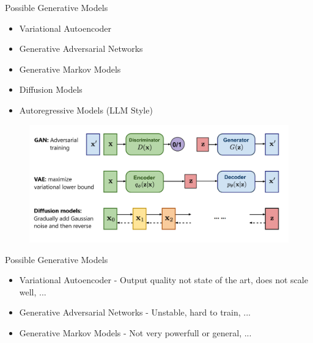 \documentclass[compress, aspectratio=169]{beamer}
\begin{document}
\begin{frame}{Possible Generative Models}
\begin{multicols}{2}
\begin{itemize}
    \item Variational Autoencoder
    \item Generative Adversarial Networks
    \item Generative Markov Models
    \item Diffusion Models
    \item Autoregressive Models (LLM Style)
\end{itemize}
\columnbreak

\begin{figure}
    \centering
    \includegraphics[width=1.0\linewidth]{figures/generativemodels.png}
\end{figure}
\end{multicols}

\end{frame}

\begin{frame}{Possible Generative Models}
\begin{itemize}
    \item Variational Autoencoder - Output quality not state of the art, does not scale well, ...
    \item Generative Adversarial Networks - Unstable, hard to train, ...
    \item Generative Markov Models - Not very powerfull or general, ...
\end{itemize}
\end{frame}
\end{document}
